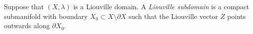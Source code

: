 
 
    Suppose that $(X, \lambda)$ is a Liouville domain. A \emph{Liouville subdomain} is a compact submanifold with boundary $X_0\subset X\setminus \partial X$ such that the Liouville vector $Z$ points outwards along $\partial X_0$.
 \label{def:liouvillesubDomain}
 